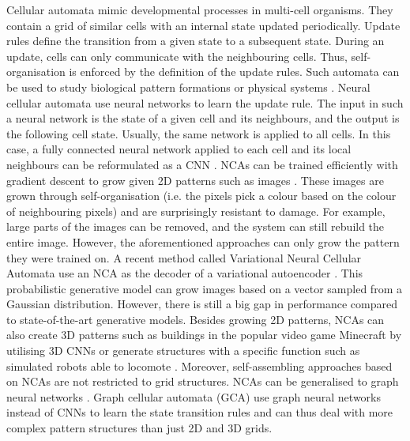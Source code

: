 Cellular automata mimic developmental processes in multi-cell organisms.
They contain a grid of similar cells with an internal state updated periodically.
Update rules define the transition from a given state to a subsequent state.
During an update, cells can only communicate with the neighbouring cells.
Thus, self-organisation is enforced by the definition of the update rules.
Such automata can be used to study biological pattern formations  or physical systems .
Neural cellular automata  use neural networks to learn the update rule.
The input in such a neural network is the state of a given cell and its neighbours, and the output is the following cell state.
Usually, the same network is applied to all cells.
In this case, a fully connected neural network applied to each cell and its local neighbours can be reformulated as a CNN .
NCAs can be trained efficiently with gradient descent to grow given 2D patterns such as images .
These images are grown through self-organisation (i.e. the pixels pick a colour based on the colour of neighbouring pixels) and are surprisingly resistant to damage.
For example, large parts of the images can be removed, and the system can still rebuild the entire image.
However, the aforementioned approaches can only grow the pattern they were trained on.
A recent method called Variational Neural Cellular Automata  use an NCA as the decoder of a variational autoencoder .
This probabilistic generative model can grow images based on a vector sampled from a Gaussian distribution.
However, there is still a big gap in performance compared to state-of-the-art generative models.
Besides growing 2D patterns, NCAs can also create 3D patterns such as buildings in the popular video game Minecraft by utilising 3D CNNs  or generate structures with a specific function such as simulated robots able to locomote .
Moreover, self-assembling approaches based on NCAs are not restricted to grid structures.
NCAs can be generalised to graph neural networks .
Graph cellular automata (GCA) use graph neural networks  instead of CNNs to learn the state transition rules and can thus deal with more complex pattern structures than just 2D and 3D grids.
